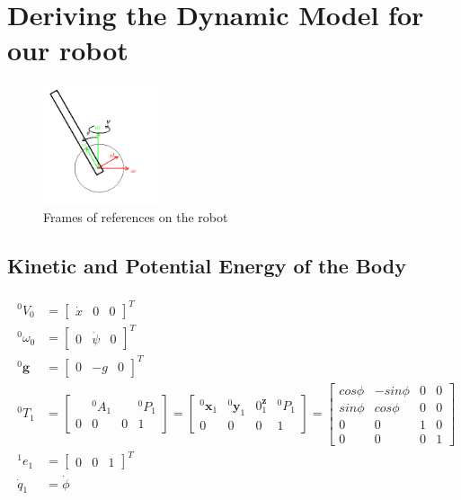 \documentclass[a4paper,10pt]{article}
\begin{document}
\section{Deriving the Dynamic Model for our robot}



\begin{figure}
 \centering
 \includegraphics[width=0.3\textwidth]{Figures/referenceImage.png}
 \caption{Frames of references on the robot}
 \label{fig:frames}
\end{figure}

\subsection{Kinetic and Potential Energy of the Body}
\begin{align} \begin{split}
 {}^0V_0 &= \left[\begin{matrix} \dot{x} & 0 & 0 \end{matrix}\right]^T \\
 {}^0\omega_0 &= \left[\begin{matrix} 0 & \dot{\psi} & 0 \end{matrix}\right]^T \\
 {}^0\mathbf{g} &= \left[\begin{matrix} 0 & -g & 0 \end{matrix}\right]^T \\
 {}^0T_1 &= \left[\begin{matrix}  & {}^0A_1 & & {}^0P_1 \\ 0 & 0 & 0 & 1\end{matrix}\right]
 = \left[\begin{matrix} {}^0\mathbf{x}_1 & {}^0\mathbf{y}_1 & {}0^\mathbf{z}_1 & {}^0P_1 \\ 0 & 0 & 0 & 1\end{matrix}\right] 
 = \left[\begin{matrix} cos\phi & -sin\phi & 0 & 0 \\ sin\phi & cos\phi & 0 & 0 \\ 0 & 0 & 1 & 0 \\ 0 & 0 & 0 & 1\end{matrix}\right] \\
 {}^1e_1 &= \left[\begin{matrix} 0 & 0 & 1 \end{matrix}\right]^T \\
 \dot{q}_1 &= \dot{\phi} \\
\end{split} \end{align}
\end{document}
